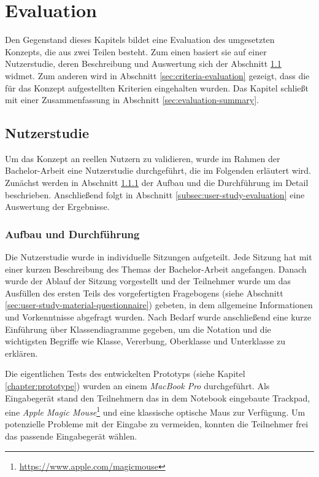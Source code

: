 
\chapter{Evaluation}
\label{chapter:evaluation}

Den Gegenstand dieses Kapitels bildet eine Evaluation des umgesetzten Konzepts, die aus zwei Teilen besteht. Zum einen basiert sie auf einer Nutzerstudie, deren Beschreibung und Auswertung sich der Abschnitt \ref{sec:user-study} widmet. Zum anderen wird in Abschnitt \ref{sec:criteria-evaluation} gezeigt, dass die für das Konzept aufgestellten Kriterien eingehalten wurden. Das Kapitel schließt mit einer Zusammenfassung in Abschnitt \ref{sec:evaluation-summary}.

\section{Nutzerstudie}
\label{sec:user-study}

Um das Konzept an reellen Nutzern zu validieren, wurde im Rahmen der Bachelor-Arbeit eine Nutzerstudie durchgeführt, die im Folgenden erläutert wird. Zunächst werden in Abschnitt \ref{subsec:user-study-setup} der Aufbau und die Durchführung im Detail beschrieben. Anschließend folgt in Abschnitt \ref{subsec:user-study-evaluation} eine Auswertung der Ergebnisse.

\subsection{Aufbau und Durchführung}
\label{subsec:user-study-setup}

Die Nutzerstudie wurde in individuelle Sitzungen aufgeteilt. Jede Sitzung hat mit einer kurzen Beschreibung des Themas der Bachelor-Arbeit angefangen. Danach wurde der Ablauf der Sitzung vorgestellt und der Teilnehmer wurde um das Ausfüllen des ersten Teils des vorgefertigten Fragebogens (siehe Abschnitt \ref{sec:user-study-material-questionnaire}) gebeten, in dem allgemeine Informationen und Vorkenntnisse abgefragt wurden. Nach Bedarf wurde anschließend eine kurze Einführung über Klassendiagramme gegeben, um die Notation und die wichtigsten Begriffe wie Klasse, Vererbung, Oberklasse und Unterklasse zu erklären.

Die eigentlichen Tests des entwickelten Prototyps (siehe Kapitel \ref{chapter:prototype}) wurden an einem \textit{MacBook Pro} durchgeführt. Als Eingabegerät stand den Teilnehmern das in dem Notebook eingebaute Trackpad, eine \textit{Apple Magic Mouse}\footnote{\url{https://www.apple.com/magicmouse}} und eine klassische optische Maus zur Verfügung. Um potenzielle Probleme mit der Eingabe zu vermeiden, konnten die Teilnehmer frei das passende Eingabegerät wählen.

